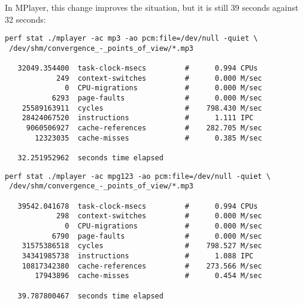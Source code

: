 \documentclass[a4paper,12pt]{scrartcl}
\begin{document}
In MPlayer, this change improves the situation, but it is still 39 seconds against 32 seconds:
\begin{verbatim}
perf stat ./mplayer -ac mp3 -ao pcm:file=/dev/null -quiet \
 /dev/shm/convergence_-_points_of_view/*.mp3

   32049.354400  task-clock-msecs         #      0.994 CPUs 
            249  context-switches         #      0.000 M/sec
              0  CPU-migrations           #      0.000 M/sec
           6293  page-faults              #      0.000 M/sec
    25589163911  cycles                   #    798.430 M/sec
    28424067520  instructions             #      1.111 IPC  
     9060506927  cache-references         #    282.705 M/sec
       12323035  cache-misses             #      0.385 M/sec

   32.251952962  seconds time elapsed
\end{verbatim}
\begin{verbatim}
perf stat ./mplayer -ac mpg123 -ao pcm:file=/dev/null -quiet \
 /dev/shm/convergence_-_points_of_view/*.mp3

   39542.041678  task-clock-msecs         #      0.994 CPUs 
            298  context-switches         #      0.000 M/sec
              0  CPU-migrations           #      0.000 M/sec
           6790  page-faults              #      0.000 M/sec
    31575386518  cycles                   #    798.527 M/sec
    34341985738  instructions             #      1.088 IPC  
    10817342380  cache-references         #    273.566 M/sec
       17943896  cache-misses             #      0.454 M/sec

   39.787800467  seconds time elapsed
\end{verbatim}
\end{document}
